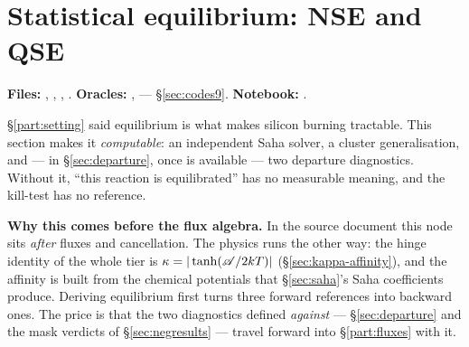 %
%

\section{Statistical equilibrium: NSE and QSE}
\label{part:equilibrium}

\begin{repopointer}
\textbf{Files:} , ,
, . \quad
\textbf{Oracles:} ,
 --- \S\ref{sec:codes9}. \quad
\textbf{Notebook:} .
\end{repopointer}

\S\ref{part:setting} said equilibrium is what makes silicon burning tractable.
This section makes it \emph{computable}: an independent Saha solver, a cluster
generalisation, and --- in \S\ref{sec:departure}, once \kap{} is available ---
two departure diagnostics. Without it, ``this reaction is equilibrated'' has no
measurable meaning, and the kill-test has no reference.

\begin{aside}
\textbf{Why this comes before the flux algebra.} In the source document this
node sits \emph{after} fluxes and cancellation. The physics runs the other way:
the hinge identity of the whole tier is $\kappa = |\tanh(\mathscr{A}/2kT)|$
(\S\ref{sec:kappa-affinity}), and the affinity \aff{} is built from the chemical
potentials that \S\ref{sec:saha}'s Saha coefficients produce. Deriving
equilibrium first turns three forward references into backward ones. The price
is that the two diagnostics defined \emph{against} \kap{} ---
\S\ref{sec:departure} and the mask verdicts of \S\ref{sec:negresults} --- travel
forward into \S\ref{part:fluxes} with it.
\end{aside}

